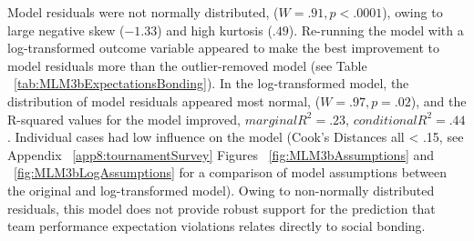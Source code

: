 \begin{CJK}{UTF8}{gbsn}
Model residuals were not normally distributed, ($W = .91, p < .0001$), owing to large negative skew ($-1.33$) and high kurtosis ($.49$). Re-running the model with a log-transformed outcome variable appeared to make the best improvement to model residuals more than the outlier-removed model (see Table ~\ref{tab:MLM3bExpectationsBonding}). In the log-transformed model, the distribution of model residuals appeared most normal,  ($W = .97, p = .02$), and the R-squared values for the model improved, $marginal R^2 = .23$, $conditional R^2 = .44$.  Individual cases had low influence on the model (Cook's Distances all < .15, see Appendix ~\ref{app8:tournamentSurvey} Figures ~\ref{fig:MLM3bAssumptions} and ~\ref{fig:MLM3bLogAssumptions} for a comparison of model assumptions between the original and log-transformed model). Owing to non-normally distributed residuals, this model does not provide robust support for the prediction that team performance expectation violations relates directly to social bonding.


\restoregeometry











\end{CJK}
